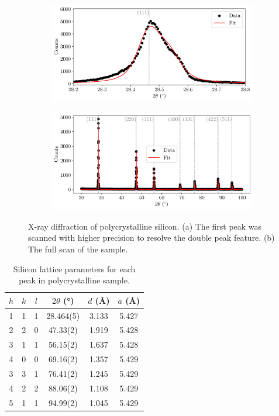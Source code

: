 \documentclass{../paper}
\begin{document}
\begin{figure}
  \centering
  \begin{subfigure}{\columnwidth}
    \centering
    \includegraphics[width=\textwidth]{analysis/peaks-Si_polycrystalline-1st_peak.pdf}
    \caption{}
    \label{fig:peaks-poly-a}
  \end{subfigure}

  \begin{subfigure}{\columnwidth}
    \centering
    \includegraphics[width=\textwidth]{analysis/peaks-Si_polycrystalline.pdf}
    \caption{}
    \label{fig:peaks-poly-b}
  \end{subfigure}

  \caption{X-ray diffraction of polycrystalline silicon. (a) The first peak was scanned with higher precision to resolve the double peak feature. (b) The full scan of the sample.}
  \label{fig:peaks-poly}
\end{figure}

\begin{table}
  \centering
  \begin{tabular}{cccccc}
    $h$ & $k$ & $l$ & $2\theta$ (°) & $d$ (\AA) & $a$ (\AA) \\
    \hline
    1 & 1 & 1 & 28.464(5) & 3.133 & 5.427 \\
    2 & 2 & 0 & 47.33(2) & 1.919 & 5.428 \\
    3 & 1 & 1 & 56.15(2) & 1.637 & 5.428 \\
    4 & 0 & 0 & 69.16(2) & 1.357 & 5.429 \\
    3 & 3 & 1 & 76.41(2) & 1.245 & 5.429 \\
    4 & 2 & 2 & 88.06(2) & 1.108 & 5.429 \\
    5 & 1 & 1 & 94.99(2) & 1.045 & 5.429 \\
    \hline
  \end{tabular}
  \caption{Silicon lattice parameters for each peak in polycrystalline sample.}
  \label{tab:lattice-parameter}
\end{table}
\end{document}
